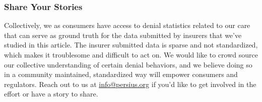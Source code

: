 \documentclass[12pt, a4paper,twoside,parskip=full]{report}
\theoremstyle{plain} %
\theoremstyle{definition} %
\theoremstyle{remark} %
\numberwithin{equation}{chapter}
\begin{document}
		
		\subsubsection{Share Your Stories}
		
		Collectively, we as consumers have access to denial statistics related to our care that can serve as ground truth for the
		data submitted by insurers that we've studied in this article. The insurer submitted data is sparse and not standardized, 
		which makes it troublesome and difficult to act on. We would like to crowd source
		our collective understanding of certain denial behaviors, and we believe doing so in a community maintained,
		standardized way will empower consumers and regulators. Reach out to us at \href{info@persius.org}{info@persius.org} if you'd like to get involved
		in the effort or have a story to share.

		
		
		
		
		
	
\end{document}
